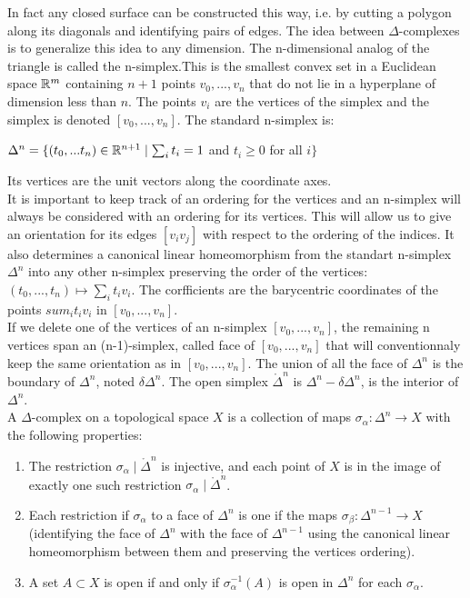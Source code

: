 \documentclass[12pt, a4paper]{article}
\begin{document}
In fact any closed surface can be constructed this way, i.e. by cutting a polygon along its diagonals and identifying pairs of edges. The idea between $\Delta$-complexes is to generalize this idea to any dimension. The n-dimensional analog of the triangle is called the n-simplex.This is the smallest convex set in a Euclidean space $\mathbb{R}^m$ containing $n + 1$ points $v_0 , ... , v_n$ that do not lie in a hyperplane of dimension less than $n$. The points $v_i$ are the vertices of the simplex and the simplex is denoted $[v_0, ..., v_n]$. The standard n-simplex is:\\

\begin{center}
  $\Delta^n = \{ (t_0,...t_n) \in \mathbb{R}^{n+1} \mid \sum_i t_i  = 1$ and $t_i \ge 0$ for all $i \}$
\end{center}

Its vertices are the unit vectors along the coordinate axes.\\

It is important to keep track of an ordering for the vertices and an n-simplex will always be considered with an ordering for its vertices. This will allow us to give an orientation for its edges $[v_iv_j]$ with respect to the ordering of the indices. It also determines a canonical linear homeomorphism from the standart n-simplex $\Delta^n$ into any other n-simplex preserving the order of the vertices: $(t_0, ..., t_n) \mapsto \sum_i t_i v_i$. The corfficients are the barycentric coordinates of the points $sum_i t_i v_i$ in $[v_0, ..., v_n]$.\\

If we delete one of the vertices of an n-simplex $[v_0, ..., v_n]$, the remaining n vertices span an (n-1)-simplex, called face of $[v_0, ..., v_n]$ that will conventionnaly keep the same orientation as in $[v_0, ..., v_n]$. The union of all the face of $\Delta^n$ is the boundary of $\Delta^n$, noted $\delta \Delta^n$. The open simplex $\mathring{\Delta}^n$ is $\Delta^n - \delta \Delta^n$, is the interior of $\Delta^n$.\\

A $\Delta$-complex on a topological space $X$ is a collection of maps $\sigma_\alpha : \Delta^n \to X$  with the following properties:\\

\begin{enumerate}[label=(\roman*)]
  \item The restriction $\sigma_\alpha \mid \mathring{\Delta}^n$ is injective, and each point of $X$ is in the image of exactly one such restriction $\sigma_\alpha \mid \mathring{\Delta}^n$.
  \item Each restriction if $\sigma_\alpha$ to a face of $\Delta^n$ is one if the maps $\sigma_\beta : \Delta^{n-1} \to X$ (identifying the face of $\Delta^n$ with the face of $\Delta^{n-1}$ using the canonical linear homeomorphism between them and preserving the vertices ordering).
  \item A set $A \subset X$ is open if and only if $\sigma_\alpha^{-1}(A)$ is open in $\Delta^n$ for each $\sigma_\alpha$.
\end{enumerate}
\end{document}
